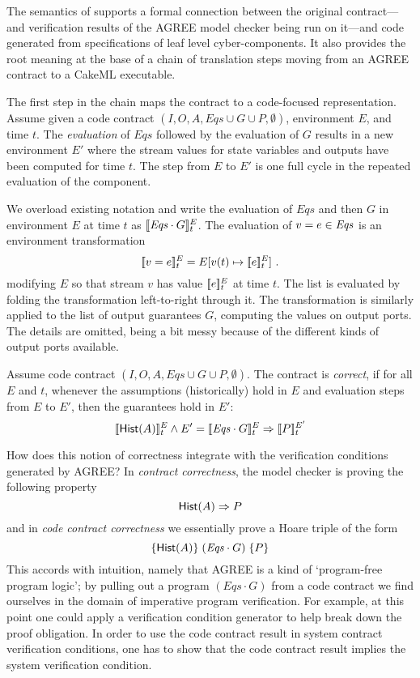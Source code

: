 The semantics of  supports a formal
connection between the original contract---and verification results of
the AGREE model checker being run on it---and code generated from
specifications of leaf level cyber-components. It also provides the
root meaning at the base of a chain of translation steps moving from
an AGREE contract to a CakeML executable.

The first step in the chain maps the contract to a code-focused
representation. Assume given a code contract
$(I,O,A,\mathit{Eqs} \cup G \cup P,\emptyset)$, environment $E$, and
time $t$. The \emph{evaluation} of $\mathit{Eqs}$ followed by the
evaluation of $G$ results in a new environment $E'$ where the stream
values for state variables and outputs have been computed for time
$t$. The step from $E$ to $E'$ is one full cycle in the repeated
evaluation of the component.

\begin{definition}[Evaluation]
We overload existing notation and write the evaluation of
$\mathit{Eqs}$ and then $G$ in environment $E$ at time $t$ as
$[\![ \mathit{Eqs}\cdot G ]\!]^E_t$. The evaluation of $v = e \in {\ensuremath{\mathit{Eqs}}}$
is an environment transformation
\[
 [\![ v = e ]\!]^E_t = E[v(t) \mapsto[\![ e ]\!]^E_t] \ .
\]
modifying $E$ so that stream $v$ has value $[\![ e ]\!]^E_t$ at time $t$.
The list {\Eqs} is evaluated by folding the transformation left-to-right
through it. The transformation is similarly applied to the list of output
guarantees $G$, computing the values on output ports. The details are
omitted, being a bit messy because of the different kinds of output
ports available.
\end{definition}


\begin{definition}
Assume code contract $(I,O,A,\mathit{Eqs} \cup G \cup P,\emptyset)$.
The contract is \emph{correct}, if for all $E$ and $t$, whenever the
assumptions (historically) hold in $E$ and evaluation steps from $E$
to $E'$, then the guarantees hold in $E'$:
\[
[\![ \mathsf{Hist}(A) ]\!]^E_t \land E' = [\![ \mathit{Eqs} \cdot G ]\!]^E_t \Rightarrow [\![ P ]\!]^{E'}_t
\]
\end{definition}

How does this notion of correctness integrate with the verification
conditions generated by AGREE? In \emph{contract correctness}, the
model checker is proving the following property
\[
\mathsf{Hist}(A) \Rightarrow P
\]
and in \emph{code contract correctness} we essentially prove a Hoare
triple of the form
\[
\{ {\mathsf{Hist}(A)} \}\; (\mathit{Eqs} \cdot G) \; \{ {P} \}
\]
This accords with intuition, namely that AGREE is a kind of
`program-free program logic'; by pulling out a program
$(\mathit{Eqs}\cdot G)$ from a code contract we find ourselves in the
domain of imperative program verification. For example, at this
point one could apply a verification condition generator to help break
down the proof obligation. In order to use the code contract result in
system contract verification conditions, one has to show that the code
contract result implies the system verification condition.

